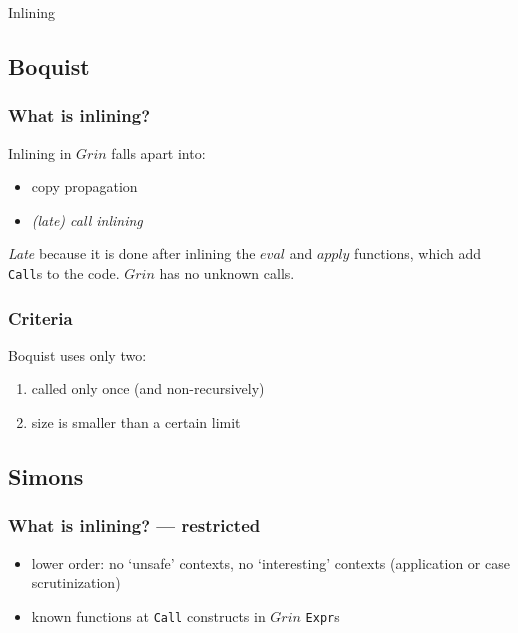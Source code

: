 \documentclass{beamer}
\newcommand{\grin}{$Grin$ }
\begin{document}
\begin{frame}[fragile]
\begin{center}
\LARGE{Inlining}
\end{center}
\end{frame}

\subsection{Boquist}
\begin{frame}[fragile]
\frametitle{What is inlining?}

Inlining in \grin falls apart into:
\begin{itemize}
\item copy propagation
\item \emph{(late) call inlining}
\end{itemize}

\emph{Late} because it is done after inlining the $eval$ and $apply$ functions, which add \texttt{Call}s to the code. \grin has no unknown calls.
\end{frame}



\begin{frame}[fragile]
\frametitle{Criteria}

Boquist uses only two:
\begin{enumerate}
\item called only once (and non-recursively)
\item size is smaller than a certain limit
\end{enumerate}

\end{frame}



\subsection{Simons}
\begin{frame}[fragile]
\frametitle{What is inlining? --- restricted}
\begin{itemize}
\item lower order: no `unsafe' contexts, no `interesting' contexts (application or case scrutinization)
\item known functions at \texttt{Call} constructs in \grin \texttt{Expr}s
\end{itemize}
\end{frame}
\end{document}
